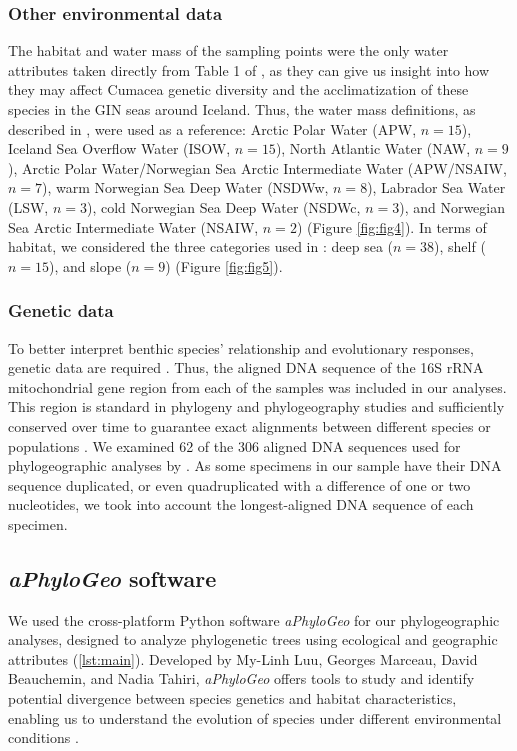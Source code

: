 \subsubsection{Other environmental data} 
The habitat and water mass of the sampling points were the only water attributes taken directly from Table 1 of \citep{uhlir_adding_2021}, as they can give us insight into how they may affect Cumacea genetic diversity and the acclimatization of these species in the GIN seas around Iceland. Thus, the water mass definitions, as described in \citep{uhlir_adding_2021}, were used as a reference: Arctic Polar Water (APW, $n=15$), Iceland Sea Overflow Water (ISOW, $n=15$), North Atlantic Water (NAW, $n=9$), Arctic Polar Water/Norwegian Sea Arctic Intermediate Water (APW/NSAIW, $n=7$), warm Norwegian Sea Deep Water (NSDWw, $n=8$), Labrador Sea Water (LSW, $n=3$), cold Norwegian Sea Deep Water (NSDWc, $n=3$), and Norwegian Sea Arctic Intermediate Water (NSAIW, $n=2$) (Figure \ref{fig:fig4}). In terms of habitat, we considered the three categories used in \citep{uhlir_adding_2021}: deep sea ($n=38$), shelf ($n=15$), and slope ($n=9$) (Figure \ref{fig:fig5}).

\subsubsection{Genetic data} 
To better interpret benthic species' relationship and evolutionary responses, genetic data are required \citep{wilson_speciation_1987, uhlir_adding_2021}. Thus, the aligned DNA sequence of the 16S rRNA mitochondrial gene region from each of the samples was included in our analyses. This region is standard in phylogeny and phylogeography studies \citep{hugenholtz1998impact} and sufficiently conserved over time to guarantee exact alignments between different species or populations \citep{saccone1999evolutionary}. We examined 62 of the 306 aligned DNA sequences used for phylogeographic analyses by \citep{uhlir_adding_2021}. As some specimens in our sample have their DNA sequence duplicated, or even quadruplicated with a difference of one or two nucleotides, we took into account the longest-aligned DNA sequence of each specimen.

\subsection{{\textit{aPhyloGeo} software}\label{aPhyloGeo-software}}
We used the cross-platform Python software \textit{aPhyloGeo} for our phylogeographic analyses, designed to analyze phylogenetic trees using ecological and geographic attributes (\autoref{lst:main}). Developed by My-Linh Luu, Georges Marceau, David Beauchemin, and Nadia Tahiri, \textit{aPhyloGeo} offers tools to study and identify potential divergence between species genetics and habitat characteristics, enabling us to understand the evolution of species under different environmental conditions \citep{koshkarov_phylogeography_2022}. 

